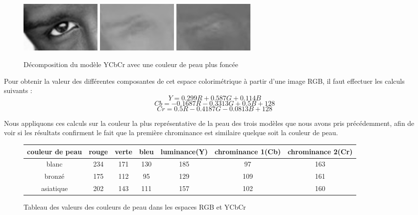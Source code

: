 \begin{figure}[H]
 \center
 \includegraphics[width=4cm]{image/luminance_black.png}
 \includegraphics[width=4cm]{image/chrominance1_black.png}
 \includegraphics[width=4cm]{image/chrominance2_black.png}
 \caption{Décomposition du modèle YCbCr avec une couleur de peau plus foncée}
\end{figure}

Pour obtenir la valeur des différentes composantes de cet espace colorimétrique à partir
d'une image RGB, il faut effectuer les calculs suivants :
$$Y = 0.299R + 0.587 G + 0.114 B$$
$$Cb = -0.1687R - 0.3313 G + 0.5B + 128$$
$$Cr = 0.5R -0.4187G -0.0813B + 128$$

Nous appliquons ces calculs sur la couleur la plus représentative de la peau des trois modèles
que nous avons pris précédemment, afin de voir si les résultats confirment le fait que la première
chrominance est similaire quelque soit la couleur de peau.

\begin{figure}[H]
 \begin{tabular}{|c|c|c|c|c|c|c|}
  \hline
  couleur de peau & rouge & verte & bleu & luminance(Y) & chrominance 1(Cb) & chrominance 2(Cr)\\
  \hline
  blanc & 234 & 171 & 130 & 185 & 97 & 163 \\
  \hline
  bronzé & 175 & 112 & 95 & 129 & 109 & 161 \\
  \hline
  asiatique & 202 & 143 & 111 & 157 & 102 & 160\\
  \hline
 \end{tabular}
 \caption{Tableau des valeurs des couleurs de peau dans les espaces RGB et YCbCr}
\end{figure}


